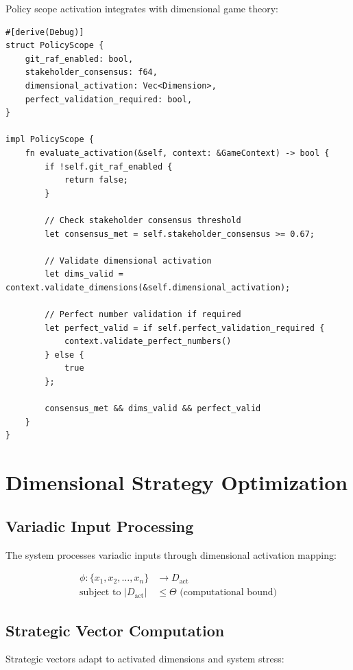 \documentclass[a4paper,12pt]{article}
\begin{document}
Policy scope activation integrates with dimensional game theory:

\begin{lstlisting}[style=rustcode, caption={Git-RAF policy scope integration}]
#[derive(Debug)]
struct PolicyScope {
    git_raf_enabled: bool,
    stakeholder_consensus: f64,
    dimensional_activation: Vec<Dimension>,
    perfect_validation_required: bool,
}

impl PolicyScope {
    fn evaluate_activation(&self, context: &GameContext) -> bool {
        if !self.git_raf_enabled {
            return false;
        }
        
        // Check stakeholder consensus threshold
        let consensus_met = self.stakeholder_consensus >= 0.67;
        
        // Validate dimensional activation
        let dims_valid = context.validate_dimensions(&self.dimensional_activation);
        
        // Perfect number validation if required
        let perfect_valid = if self.perfect_validation_required {
            context.validate_perfect_numbers()
        } else {
            true
        };
        
        consensus_met && dims_valid && perfect_valid
    }
}
\end{lstlisting}

\section{Dimensional Strategy Optimization}

\subsection{Variadic Input Processing}

The system processes variadic inputs through dimensional activation mapping:

\begin{align}
\phi: \{x_1, x_2, \ldots, x_n\} &\to D_{\text{act}} \\
\text{subject to } |D_{\text{act}}| &\leq \Theta \text{ (computational bound)}
\end{align}

\subsection{Strategic Vector Computation}

Strategic vectors adapt to activated dimensions and system stress:
\end{document}
